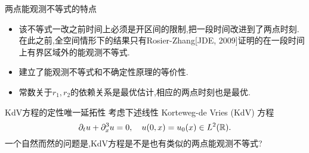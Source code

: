 \begin{frame}[t]{两点能观测不等式的特点}
  \begin{itemize}
    \item 该不等式一改之前时间上必须是开区间的限制,把一段时间改进到了两点时刻.在此之前,全空间情形下的结果只有Rosier-Zhang[JDE, 2009]证明的在一段时间上有界区域外的能观测不等式.
    \item 建立了能观测不等式和不确定性原理的等价性.
    \item 常数关于$r_1,r_2$的依赖关系是最优估计,相应的两点时刻也是最优.
  \end{itemize}
\end{frame}


\begin{frame}[t]{KdV方程的定性唯一延拓性}
  考虑下述线性 Korteweg-de Vries (KdV) 方程
  \begin{equation}\label{kdv}
    \partial_t u +\partial_x^3u=0,\quad u(0,x)=u_0(x)\in L^2(\mathbb{R}).
  \end{equation}
一个自然而然的问题是,KdV方程是不是也有类似的两点能观测不等式?
\end{frame}

